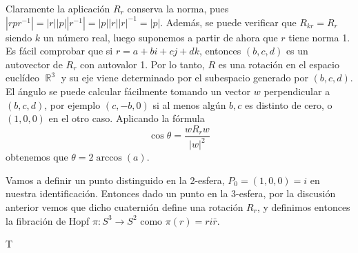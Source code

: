 \documentclass[11pt]{diazessay} %
\DeclareMathOperator{\R}{\mathbb{R}}
\begin{document}
Claramente la aplicación $R_r$ conserva la norma, pues $|rpr^{-1}|=|r||p||r^{-1}|=|p||r||r|^{-1}=|p|$. Además, se puede verificar que $R_{kr} = R_r$ siendo $k$ un número real, luego suponemos a partir de ahora que $r$ tiene norma 1. Es fácil comprobar que si $r=a+bi+cj+dk$, entonces $(b,c,d)$ es un autovector de $R_r$ con autovalor 1. Por lo tanto, $R$ es una rotación en el espacio euclídeo $\R^3$ y su eje viene determinado por el subespacio generado por $(b,c,d)$. El ángulo se puede calcular fácilmente tomando un vector $w$ perpendicular a $(b,c,d)$, por ejemplo $(c,-b,0)$ si al menos algún $b,c$ es distinto de cero, o $(1,0,0)$ en el otro caso. Aplicando la fórmula
\[\cos\theta = \frac{wR_rw}{|w|^2}\]
obtenemos que $\theta = 2\arccos(a)$.

Vamos a definir un punto distinguido en la 2-esfera, $P_0=(1,0,0)=i$ en nuestra identificación. Entonces dado un punto en la 3-esfera, por la discusión anterior vemos que dicho cuaternión define una rotación $R_r$, y definimos entonces la fibración de Hopf $\pi:S^3\to S^2$ como $\pi(r)=ri\bar{r}$.

T





\end{document}
